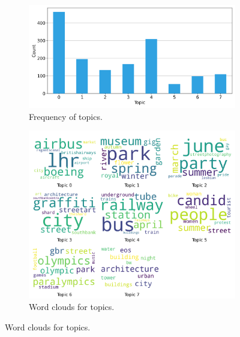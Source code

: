 \documentclass{article}
\theoremstyle{remark}
\begin{document}
\begin{figure}[!h]
    \centering
    \begin{subfigure}{0.45\textwidth}
        \centering
        \includegraphics[width=\linewidth]{figures/places_sense_daytime_locals.png} 
        \caption{Frequency of topics.}
        \label{fig:places_sense_daytime_locals}
    \end{subfigure}
    \hfill
    \begin{subfigure}{0.5\textwidth}
        \centering
        \includegraphics[width=\linewidth]{figures/topics_daytime_locals.png} 
        \caption{Word clouds for topics.}
        \label{fig:topics_daytime_locals}
    \end{subfigure}
    

\end{figure}
\end{document}
